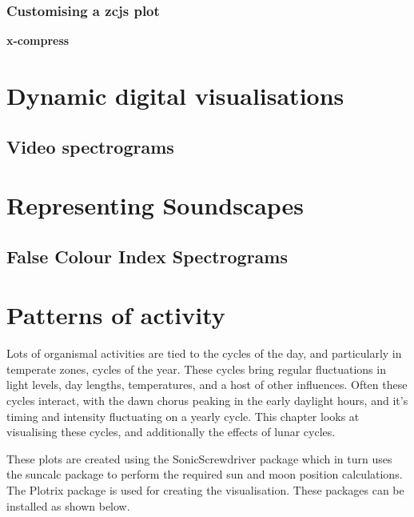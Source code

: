 \documentclass[
]{book}
\begin{document}
\hypertarget{customising-a-zcjs-plot}{%
\subsection{Customising a zcjs plot}\label{customising-a-zcjs-plot}}

\textbf{x-compress}

\hypertarget{dynamic-digital-visualisations}{%
\chapter{Dynamic digital visualisations}\label{dynamic-digital-visualisations}}

\hypertarget{video-spectrograms}{%
\section{Video spectrograms}\label{video-spectrograms}}

\hypertarget{representing-soundscapes}{%
\chapter{Representing Soundscapes}\label{representing-soundscapes}}

\hypertarget{false-colour-index-spectrograms}{%
\section{False Colour Index Spectrograms}\label{false-colour-index-spectrograms}}

\hypertarget{patterns-of-activity}{%
\chapter{Patterns of activity}\label{patterns-of-activity}}

Lots of organismal activities are tied to the cycles of the day, and particularly in temperate zones, cycles of the year. These cycles bring regular fluctuations in light levels, day lengths, temperatures, and a host of other influences. Often these cycles interact, with the dawn chorus peaking in the early daylight hours, and it's timing and intensity fluctuating on a yearly cycle. This chapter looks at visualising these cycles, and additionally the effects of lunar cycles.

These plots are created using the SonicScrewdriver package \citep{sonicscrewdriver} which in turn uses the suncalc package \citep{suncalc} to perform the required sun and moon position calculations. The Plotrix package \citep{plotrix} is used for creating the visualisation. These packages can be installed as shown below.
\end{document}
